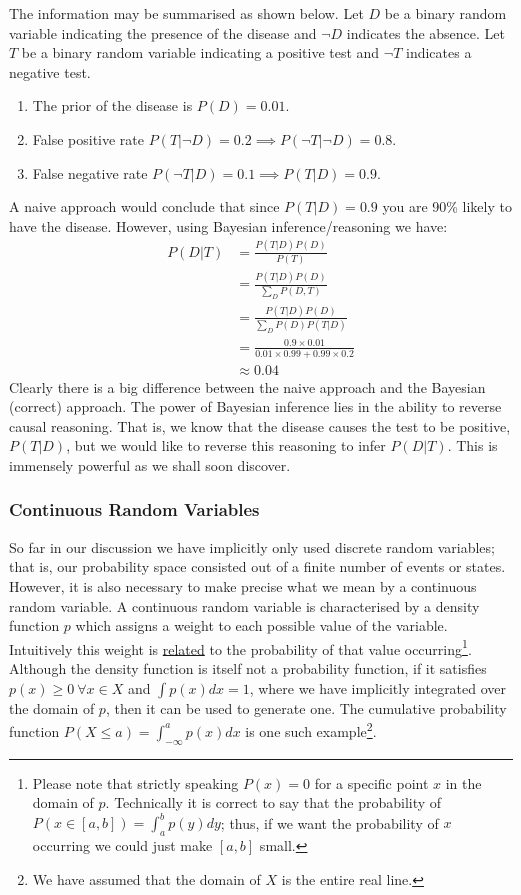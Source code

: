 The information may be summarised as shown below. Let $D$ be a binary random variable indicating the presence of the disease and $\neg D$ indicates the absence. Let $T$ be a binary random variable indicating a positive test and $\neg T$ indicates a negative test. 
\begin{enumerate}
\item
The prior of the disease is $P(D) = 0.01$.
\item
False positive rate $P(T|\neg D) = 0.2 \implies P(\neg T|\neg D) = 0.8$.
\item
False negative rate $P(\neg T|D) = 0.1 \implies P(T|D) = 0.9$.
\end{enumerate}
A naive approach would conclude that since $P(T|D) = 0.9$ you are 90\% likely to have the disease. However, using Bayesian inference/reasoning we have: 
\begin{equation*}
\begin{aligned}
P(D|T) &= \frac{P(T|D)P(D)}{P(T)} \\
&=  \frac{P(T|D)P(D)}{\sum_D P(D,T)} \\
&= \frac{P(T|D)P(D)}{\sum_D P(D)P(T|D)} \\
& = \frac{0.9 \times 0.01}{0.01 \times 0.99 + 0.99 \times 0.2} \\
&\approx 0.04
\end{aligned}
\end{equation*}
Clearly there is a big difference between the naive approach and the Bayesian (correct) approach. The power of Bayesian inference lies in the ability to reverse causal reasoning. That is, we know that the disease causes the test to be positive, $P(T|D)$, but we would like to reverse this reasoning to infer $P(D|T)$. This is immensely powerful as we shall soon discover.   

\subsubsection{Continuous Random Variables}

So far in our discussion we have implicitly only used discrete random variables; that is, our probability space consisted out of a finite number of events or states. However, it is also necessary to make precise what we mean by a continuous random variable. A continuous random variable is characterised by a density function $p$ which assigns a weight to each possible value of the variable. Intuitively this weight is \underline{related} to the probability of that value occurring\footnote{Please note that strictly speaking $P(x)=0$ for a specific point $x$ in the domain of $p$. Technically it is correct to say that the probability of $P(x \in [a,b]) = \int_a^b p(y)dy$; thus, if we want the probability of $x$ occurring we could just make $[a,b]$ small.}. Although the density function is itself not a probability function, if it satisfies $p(x) \geq 0~\forall x \in X$ and $\int p(x)dx = 1$, where we have implicitly integrated over the domain of $p$, then it can be used to generate one. The cumulative probability function $P(X \leq a)=\int^a_{-\infty} p(x)dx$ is one such example\footnote{We have assumed that the domain of $X$ is the entire real line.}. 


